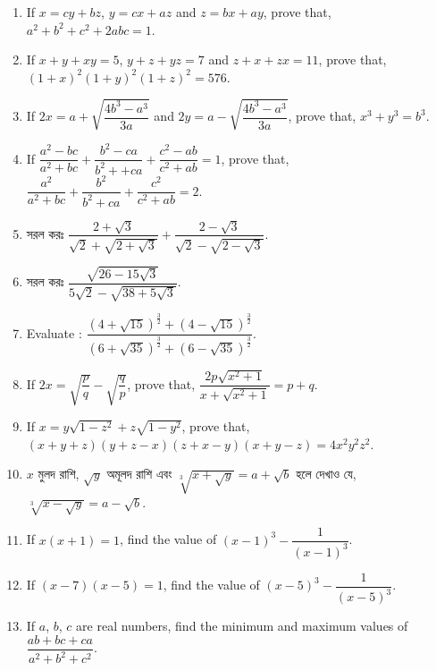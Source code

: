 \documentclass[11pt, a4paper]{article}
\begin{document}
\begin{enumerate}
	\item If $x = cy + bz$, $y = cx + az$ and $z = bx + ay$, prove that, $a^2 + b^2 + c^2 + 2abc = 1$.
	
	\item If $x + y + xy = 5$, $y + z + yz = 7$ and $z + x + zx = 11$, prove that, $(1+x)^2(1+y)^2(1+z)^2 = 576$.
	
	\item If $2x = a + \sqrt{\dfrac{4b^3 - a^3}{3a}}$ and $2y = a - \sqrt{\dfrac{4b^3 - a^3}{3a}}$, prove that, $x^3 + y^3 = b^3$.
	
	\item If $\dfrac{a^2 - bc}{a^2 + bc} + \dfrac{b^2 - ca}{b^2 ++ ca} + \dfrac{c^2 - ab}{c^2 + ab} = 1$, prove that, $\dfrac{a^2}{a^2 + bc} + \dfrac{b^2}{b^2 + ca} + \dfrac{c^2}{c^2 + ab} = 2$.
	
	\item \textbengali{সরল করঃ} $\dfrac{2 + \sqrt{3}}{\sqrt{2} + \sqrt{2 + \sqrt{3}}} + \dfrac{2 - \sqrt{3}}{\sqrt{2} - \sqrt{2 - \sqrt{3}}}$.
	
	\item \textbengali{সরল করঃ} $\dfrac{\sqrt{26 - 15\sqrt{3}}}{5\sqrt{2} - \sqrt{38 + 5\sqrt{3}}}$.
	
	\item Evaluate : $\dfrac{(4 + \sqrt{15})^\frac{3}{2} + (4 - \sqrt{15})^\frac{3}{2}}{(6 + \sqrt{35})^\frac{3}{2} + (6 - \sqrt{35})^\frac{3}{2}}$.
	
	\item If $2x = \sqrt{\dfrac{p}{q}} - \sqrt{\dfrac{q}{p}}$, prove that, $\dfrac{2p\sqrt{x^2 + 1}}{x + \sqrt{x^2 + 1}} = p+q$.
	
	\item If $x = y \sqrt{1 - z^2} + z \sqrt{1 - y^2}$, prove that, $(x + y + z)(y + z -x)(z + x - y)(x + y - z) = 4x^2 y^2 z^2$.
	
	\item $x$ \textbengali{মুলদ রাশি}, $\sqrt{y}$ \textbengali{অমূলদ রাশি এবং} $\sqrt[3]{x + \sqrt{y}} = a + \sqrt{b}$ \textbengali{হলে দেখাও যে,} $\sqrt[3]{x - \sqrt{y}} = a - \sqrt{b}$.
	
	\item If $x(x+1) = 1$, find the value of $(x-1)^3 - \dfrac{1}{(x-1)^3}$.
	
	\item If $(x-7)(x-5) = 1$, find the value of $(x-5)^3 - \dfrac{1}{(x-5)^3}$.
	
	\item If $a$, $b$, $c$ are real numbers, find the minimum and maximum values of $\dfrac{ab + bc + ca}{a^2 + b^2 + c^2}$.
	

\end{enumerate}
\end{document}
